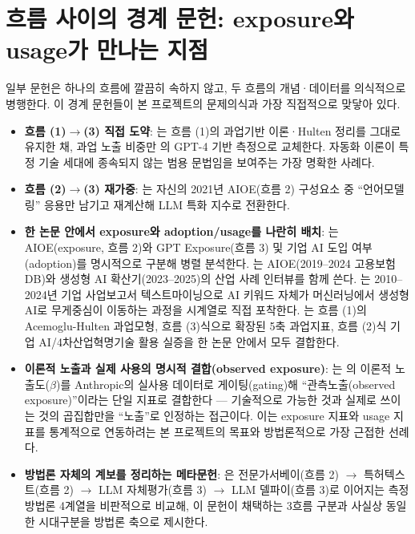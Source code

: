 \documentclass[11pt]{article}
\begin{document}
\section{흐름 사이의 경계 문헌: exposure와 usage가 만나는 지점}
\label{sec:boundary}

일부 문헌은 하나의 흐름에 깔끔히 속하지 않고, 두 흐름의 개념·데이터를 의식적으로 병행한다. 이 경계 문헌들이 본 프로젝트의 문제의식과 가장 직접적으로 맞닿아 있다.

\begin{itemize}[leftmargin=*]
  \item \textbf{흐름 (1)$\to$(3) 직접 도약}: \textcite{acemoglu-2024-the-simple-macroeconomics-of-ai}는 흐름 (1)의 과업기반 이론·Hulten 정리를 그대로 유지한 채, 과업 노출 비중만 \textcite{eloundou-2023-gpts-are-gpts-an-early}의 GPT-4 기반 측정으로 교체한다. 자동화 이론이 특정 기술 세대에 종속되지 않는 범용 문법임을 보여주는 가장 명확한 사례다.
  \item \textbf{흐름 (2)$\to$(3) 재가중}: \textcite{felten-2023-how-will-language-modelers-like-chatgpt}는 자신의 2021년 AIOE(흐름 2) 구성요소 중 ``언어모델링'' 응용만 남기고 재계산해 LLM 특화 지수로 전환한다.
  \item \textbf{한 논문 안에서 exposure와 adoption/usage를 나란히 배치}: \textcite{chang-2024-ai-development-employment-effects}는 AIOE(exposure, 흐름 2)와 GPT Exposure(흐름 3) 및 기업 AI 도입 여부(adoption)를 명시적으로 구분해 병렬 분석한다. \textcite{noh-2025-ai-labor-coexistence}는 AIOE(2019--2024 고용보험DB)와 생성형 AI 확산기(2023--2025)의 산업 사례 인터뷰를 함께 쓴다. \textcite{seo-2025-ai-adoption-characteristics-business-reports}는 2010--2024년 기업 사업보고서 텍스트마이닝으로 AI 키워드 자체가 머신러닝에서 생성형 AI로 무게중심이 이동하는 과정을 시계열로 직접 포착한다. \textcite{nam-2026-ai-macroeconomic-impact-analysis}는 흐름 (1)의 Acemoglu-Hulten 과업모형, 흐름 (3)식으로 확장된 5축 과업지표, 흐름 (2)식 기업 AI/4차산업혁명기술 활용 실증을 한 논문 안에서 모두 결합한다.
  \item \textbf{이론적 노출과 실제 사용의 명시적 결합(observed exposure)}: \textcite{massenkoff-2026-labor-market-impacts-of-ai}는 \textcite{eloundou-2023-gpts-are-gpts-an-early}의 이론적 노출도($\beta$)를 Anthropic의 실사용 데이터로 게이팅(gating)해 ``관측노출(observed exposure)''이라는 단일 지표로 결합한다 — 기술적으로 가능한 것과 실제로 쓰이는 것의 곱집합만을 ``노출''로 인정하는 접근이다. 이는 exposure 지표와 usage 지표를 통계적으로 연동하려는 본 프로젝트의 목표와 방법론적으로 가장 근접한 선례다.
  \item \textbf{방법론 자체의 계보를 정리하는 메타문헌}: \textcite{lee-2024-generative-ai-labor-market-measurement}은 전문가서베이(흐름 2) $\to$ 특허텍스트(흐름 2) $\to$ LLM 자체평가(흐름 3) $\to$ LLM 델파이(흐름 3)로 이어지는 측정방법론 4계열을 비판적으로 비교해, 이 문헌이 채택하는 3흐름 구분과 사실상 동일한 시대구분을 방법론 축으로 제시한다.
\end{itemize}
\end{document}
